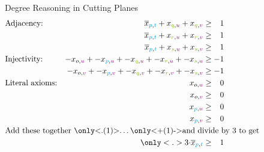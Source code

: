 \documentclass[aspectratio=169,compress,10pt]{beamer}
\begin{document}
\begin{frame}[fragile]{Degree Reasoning in Cutting Planes}
\begin{align*}
    &\textnormal{Adjacency:}&\overline{x}_{\textcolor{uofgcobalt}{p}{,}\textcolor{uofgcobalt}{t}} + x_{\textcolor{uofglawn}{q}{,}\textcolor{uofgthistle}{u}} + x_{\textcolor{uofglawn}{q}{,}\textcolor{uofgthistle}{v}} &\ge\phantom{-}1
    \hspace{0.3\textwidth} %
    \\
    &&\overline{x}_{\textcolor{uofgcobalt}{p}{,}\textcolor{uofgcobalt}{t}} + x_{\textcolor{uofglawn}{r}{,}\textcolor{uofgthistle}{u}} + x_{\textcolor{uofglawn}{r}{,}\textcolor{uofgthistle}{v}} &\ge \phantom{-}1 \\
    &&\overline{x}_{\textcolor{uofgcobalt}{p}{,}\textcolor{uofgcobalt}{t}} + x_{\textcolor{uofglawn}{s}{,}\textcolor{uofgthistle}{u}} + x_{\textcolor{uofglawn}{s}{,}\textcolor{uofgthistle}{v}} &\ge \phantom{-}1 \\
     &\textnormal{Injectivity:}   &-x_{o{,}\textcolor{uofgthistle}{u}} + -x_{\textcolor{uofgcobalt}{p}{,}\textcolor{uofgthistle}{u}} + -x_{\textcolor{uofglawn}{q}{,}\textcolor{uofgthistle}{u}} + -x_{\textcolor{uofglawn}{r}{,}\textcolor{uofgthistle}{u}} + -x_{\textcolor{uofglawn}{s}{,}\textcolor{uofgthistle}{u}} &\ge -1 \\
        &&-x_{o{,}\textcolor{uofgthistle}{v}} + -x_{\textcolor{uofgcobalt}{p}{,}\textcolor{uofgthistle}{v}} + -x_{\textcolor{uofglawn}{q}{,}\textcolor{uofgthistle}{v}} + -x_{\textcolor{uofglawn}{r}{,}\textcolor{uofgthistle}{v}} + -x_{\textcolor{uofglawn}{s}{,}\textcolor{uofgthistle}{v}} &\ge -1 \\
    &\textnormal{Literal axioms:}&x_{o{,}\textcolor{uofgthistle}{u}} &\ge \phantom{-}0 \\
    &&x_{o{,}\textcolor{uofgthistle}{v}} &\ge\phantom{-} 0 \\
    &&x_{\textcolor{uofgcobalt}{p}{,}\textcolor{uofgthistle}{u}} &\ge\phantom{-} 0 \\
    &&x_{\textcolor{uofgcobalt}{p}{,}\textcolor{uofgthistle}{v}} &\ge\phantom{-} 0 \\
    &\rlap{\text{Add these together \only<.(1)>{\dots}\only<+(1)->{and divide by 3 to get}}} \\
    &&\only<.>{3\cdot}\overline{x}_{\textcolor{uofgcobalt}{p}{,}\textcolor{uofgcobalt}{t}} &\ge\phantom{-} 1
  \end{align*}
\end{frame}
\end{document}
